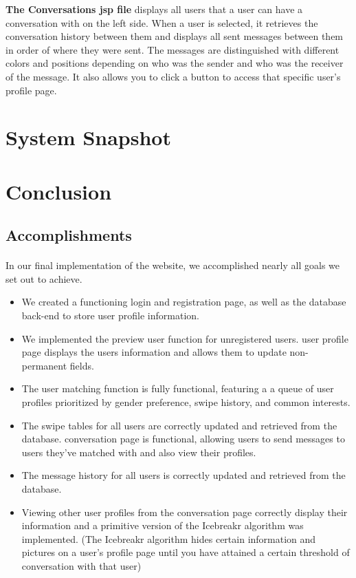 \documentclass{article}
\begin{document}
\begin{enumerate}
        \textbf{The Conversations jsp file} displays all users that a user can have a conversation with on the left side. When a user is selected, it retrieves the conversation history between them and displays all sent messages between them in order of where they were sent. The messages are distinguished with different colors and positions depending on who was the sender and who was the receiver of the message. It also allows you to click a button to access that specific user's profile page.
    \end{enumerate}
    \section{System Snapshot}
    \section{Conclusion}
    \subsection{Accomplishments}
    \paragraph{}
    In our final implementation of the website, we accomplished nearly all goals we set out to achieve.
    \begin{itemize}
    \item We created a functioning login and registration page, as well as the database back-end to store user profile information.
    \item We implemented the preview user function for unregistered users.
    \itemThe user profile page displays the users information and allows them to update non-permanent fields.
    \item The user matching function is fully functional, featuring a a queue of user profiles prioritized by gender preference, swipe history, and common interests.
    \item The swipe tables for all users are correctly updated and retrieved from the database.
    \itemThe conversation page is functional, allowing users to send messages to users they've matched with and also view their profiles.
    \item The message history for all users is correctly updated and retrieved from the database.
    \item Viewing other user profiles from the conversation page correctly display their information and a primitive version of the Icebreakr algorithm was implemented. (The Icebreakr algorithm hides certain information and pictures on a user's profile page until you have attained a certain threshold of conversation with that user)
    \end{itemize}
\end{document}
